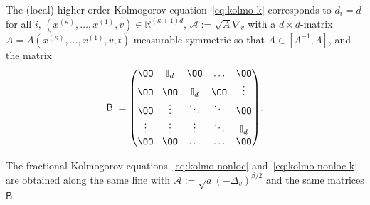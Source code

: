 \documentclass[JEP,XML,SOM,Unicode,NoFloatCountersInSection,published]{cedram}
\theoremstyle{definition}
\newcommand\R{{\mathbb R}}
\newcommand{\cA}{{\mathcal A}}
\newcommand{\sB}{{\mathsf B}}
\begin{document}
The (local) higher-order Kolmogorov equation~\eqref{eq:kolmo-k}
corresponds to $d_i=d$ for all $i$,
$(x^{(\kappa)},\dots,x^{(1)},v) \in \R^{(\kappa+1)d}$,
$\cA:=\sqrt{A} \nabla_{v} $ with a $d \times d$-matrix
$A=A(x^{(\kappa)},\dots,x^{(1)},v,t)$ measurable symmetric
so that $A \in [\Lambda^{-1},\Lambda]$, and the matrix
\begin{equation*}\arraycolsep4.5pt
\sB := \begin{pmatrix}
\OO & \mathbb{I}_d & \OO & \ldots & \OO \\
\OO & \OO & \mathbb{I}_d & \OO& \vdots \\
\OO & \vdots & \ddots & \ddots & \OO \\
\vdots & \vdots & \vdots & \ddots & \mathbb{I}_d \\
\OO & \OO & \ldots & \ldots & \OO
\end{pmatrix}\!.
\end{equation*}

The fractional Kolmogorov equations~\eqref{eq:kolmo-nonloc}
and~\eqref{eq:kolmo-nonloc-k} are obtained along the same line
with $\cA:= \sqrt{a} (-\Delta_v)^{\beta/2}$ and the same
matrices $\sB$.
\end{document}
